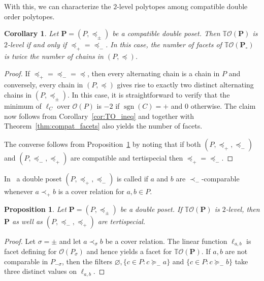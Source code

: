 \documentclass[11pt]{amsart}
\newtheorem{cor}[thm]{Corollary}
\newtheorem{prop}[thm]{Proposition}
\theoremstyle{definition}
\begin{document}
With this, we can characterize the $2$-level polytopes among compatible
double order polytopes.
\begin{cor}\label{cor:TO-2l}
    Let ${\mathbf{P}} = ({P},\preceq_\pm)$ be a compatible double poset. Then
    ${{\mathbb{T}}{\mathcal{O}({\mathbf{P}})}}$ is $2$-level if and only if $\preceq_+ = \preceq_-$.  In
    this case, the number of facets of ${{\mathbb{T}}{\mathcal{O}({{{\mathbf{P}}_\circ}})}}$ is twice the
    number of chains in $({P},\preceq)$.
\end{cor}
\begin{proof}
    If $\preceq_+ = \preceq_- = \preceq$, then every alternating chain is a
    chain in ${P}$ and conversely, every chain in $({P},\preceq)$ gives rise to
    exactly two distinct alternating chains in $({P},\preceq_\pm)$. In this
    case, it is straightforward to verify that the minimum of $\ell_C$ over
    ${\mathcal{O}({P})}$ is $-2$ if $\operatorname{sgn}(C) = +$ and $0$ otherwise. The claim now
    follows from Corollary~\ref{cor:TO_ineq} and together with
    Theorem~\ref{thm:compat_facets} also yields the number of facets.

    The converse follows from Proposition~\ref{prop:2l-terti} by noting that
    if both $({P},\preceq_+,\preceq_-)$ and $({P},\preceq_-,\preceq_+)$ are
    compatible and tertispecial then $\preceq_+ = \preceq_-$.
\end{proof}

In~\cite{Grinberg} a double poset $({P},\preceq_+,\preceq_-)$ is called
{\textbf{\color{black}{tertispecial}}} if $a$ and $b$ are $\prec_{-}$-comparable whenever
$a\prec_+ b$ is a cover relation for $a,b \in {P}$.

\begin{prop}\label{prop:2l-terti}
    Let ${\mathbf{P}} = ({P},\preceq_\pm)$ be a double poset.  If ${{\mathbb{T}}{\mathcal{O}({\mathbf{P}})}}$ is
    $2$-level, then ${\mathbf{P}}$ as well as $({P},\preceq_-,\preceq_+)$ are
    tertispecial.
\end{prop}
\begin{proof}
    Let $\sigma = \pm$ and let $a \prec_\sigma b$ be a cover relation. The
    linear function $\ell_{a,b}$ is facet defining for ${\mathcal{O}({{P}_\sigma})}$ and
    hence yields a facet for ${{\mathbb{T}}{\mathcal{O}({\mathbf{P}})}}$. If $a,b$ are not comparable in
    ${P}_{-\sigma}$, then the filters ${\varnothing}, \{ c \in {P} : c \succeq_-
    a\}$ and $\{ c \in {P} : c \succeq_- b\}$ take three distinct values on
    $\ell_{a,b}$.
\end{proof}
\end{document}
